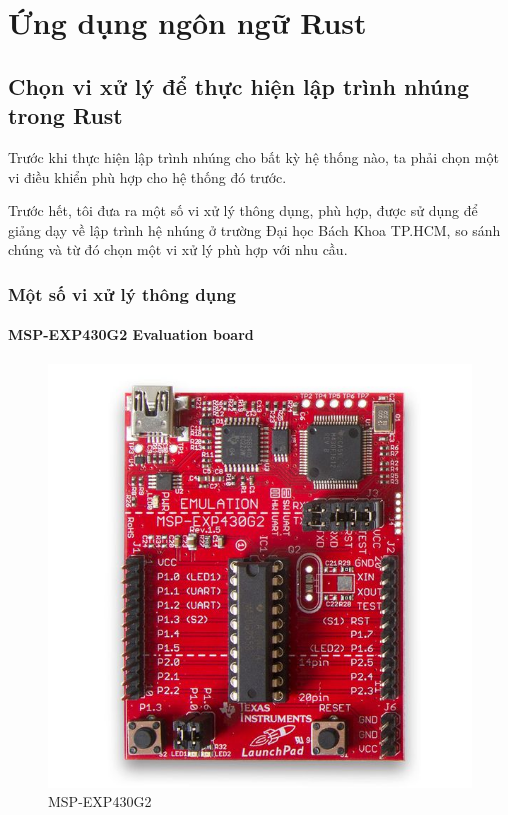 \chapter{Ứng dụng ngôn ngữ Rust}
\section{Chọn vi xử lý để thực hiện lập trình nhúng trong Rust}
Trước khi thực hiện lập trình nhúng cho bất kỳ hệ thống nào, ta phải chọn một vi điều khiển phù hợp cho hệ thống đó trước.

Trước hết, tôi đưa ra một số vi xử lý thông dụng, phù hợp, được sử dụng để giảng dạy về lập trình hệ nhúng ở trường Đại học Bách Khoa TP.HCM, so sánh chúng và từ đó chọn một vi xử lý phù hợp với nhu cầu.
\subsection{Một số vi xử lý thông dụng}
\subsubsection{MSP-EXP430G2 Evaluation board}
\begin{figure}[ht]
\centering
\includegraphics[scale=0.35]{images/launchpad-mspexp430g2-02.jpg}
\caption{MSP-EXP430G2}
\end{figure}
\clearpage

